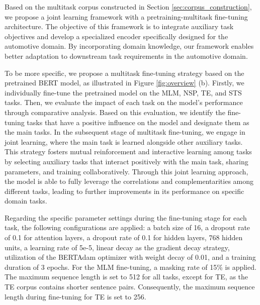 \documentclass[mathematics,article,submit,moreauthors]{Definitions/mdpi}
\newcommand{\1}[1]{\mathds{1}\left[#1\right]}
\newcommand{\secref}[1]{Section \ref{#1}}
\newcommand{\figref}[1]{Figure \ref{#1}}
\begin{document}
Based on the multitask corpus constructed in \secref{sec:corpus_construction}, we propose a joint learning framework with a pretraining-multitask fine-tuning architecture. The objective of this framework is to integrate auxiliary task objectives and develop a specialized encoder specifically designed for the automotive domain. By incorporating domain knowledge, our framework enables better adaptation to downstream task requirements in the automotive domain.

To be more  specific, we propose a multitask fine-tuning strategy based on the pretrained BERT model, as illustrated in \figref{fig:overview} (b). Firstly, we individually fine-tune the pretrained model  on the MLM, NSP, TE, and STS tasks. Then, we evaluate the impact of each task on the model's performance through comparative analysis.  Based on this evaluation, we identify the fine-tuning tasks that have a positive influence on the model and designate them as the main tasks. In the subsequent stage of multitask fine-tuning, we engage in joint learning, where the main task is learned alongside other auxiliary tasks. This strategy fosters mutual reinforcement and interactive learning among tasks by selecting auxiliary tasks that interact positively with the main task, sharing parameters, and training collaboratively. Through this joint learning approach, the model is able to fully leverage the correlations and complementarities among different tasks, leading to further improvements in its performance on specific domain tasks.

Regarding the specific parameter settings during the fine-tuning stage for each task, the following configurations are applied: a batch size of 16, a dropout rate of 0.1 for attention layers, a dropout rate of 0.1 for hidden layers, 768 hidden units, a learning rate of 5e-5, linear decay as the gradient decay strategy, utilization of the BERTAdam optimizer with weight decay of 0.01, and a training duration of 3 epochs. For the MLM fine-tuning, a masking rate of 15\% is applied. The maximum sequence length is set to 512 for all tasks, except for TE, as the TE corpus contains shorter sentence pairs. Consequently, the maximum sequence length during fine-tuning for TE is set to 256.

%
\end{document}
